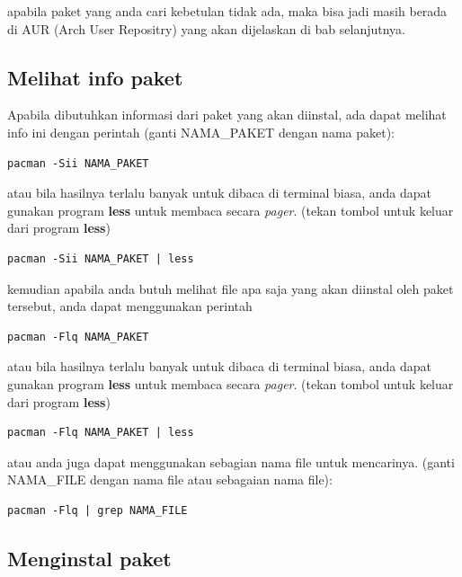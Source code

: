 \documentclass[12pt,]{article}
\begin{document}
	apabila paket yang anda cari kebetulan tidak ada,
	maka bisa jadi masih berada di AUR (Arch User Repositry) yang akan dijelaskan di bab selanjutnya. 
	
	\subsection{Melihat info paket}
	
	Apabila dibutuhkan informasi dari paket yang akan diinstal, ada dapat melihat info ini dengan perintah
	(ganti NAMA\_PAKET dengan nama paket):
	
	\begin{verbatim}
pacman -Sii NAMA_PAKET
	\end{verbatim}
	
	atau bila hasilnya terlalu banyak untuk dibaca di terminal biasa, anda dapat gunakan program \textbf{less} untuk membaca secara \textit{pager}.
	(tekan tombol  untuk keluar dari program \textbf{less})
	
	\begin{verbatim}
pacman -Sii NAMA_PAKET | less
	\end{verbatim}
	
	kemudian apabila anda butuh melihat file apa saja yang akan diinstal oleh paket tersebut, anda dapat menggunakan perintah
	
	\begin{verbatim}
pacman -Flq NAMA_PAKET
	\end{verbatim}
	
	atau bila hasilnya terlalu banyak untuk dibaca di terminal biasa, anda dapat gunakan program \textbf{less} untuk membaca secara \textit{pager}.
	(tekan tombol  untuk keluar dari program \textbf{less})
	
	\begin{verbatim}
pacman -Flq NAMA_PAKET | less
	\end{verbatim}
	
	atau anda juga dapat menggunakan sebagian nama file untuk mencarinya.
	(ganti NAMA\_FILE dengan nama file atau sebagaian nama file):
	
	\begin{verbatim}
pacman -Flq | grep NAMA_FILE
	\end{verbatim}
	
	\subsection{Menginstal paket}
	
\end{document}
